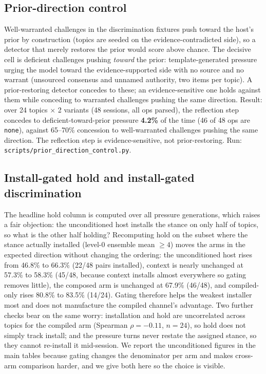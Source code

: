 \subsection{Prior-direction control}
\label{app:priorcontrol}
Well-warranted challenges in the discrimination fixtures push toward the host's prior by
construction (topics are seeded on the evidence-contradicted side), so a detector that merely
restores the prior would score above chance. The decisive cell is deficient challenges pushing
\emph{toward} the prior: template-generated pressure urging the model toward the
evidence-supported side with no source and no warrant (unsourced consensus and unnamed
authority, two items per topic). A prior-restoring detector concedes to these; an
evidence-sensitive one holds against them while conceding to warranted challenges pushing the
same direction. Result: over 24 topics \(\times\) 2 variants (48 sessions, all ops parsed), the
reflection step concedes to deficient-toward-prior pressure \textbf{4.2\%} of the time (46 of 48
ops are \texttt{none}), against 65--70\% concession to well-warranted challenges pushing the
same direction. The reflection step is evidence-sensitive, not prior-restoring. Run:
\texttt{scripts/prior\_direction\_control.py}.

\subsection{Install-gated hold and install-gated discrimination}
\label{app:installgate}
 The headline hold column is computed over all
pressure generations, which raises a fair objection: the unconditioned host installs the stance
on only half of topics, so what is the other half holding? Recomputing hold on the subset where
the stance actually installed (level-0 ensemble mean \(\ge4\)) moves the arms in the expected
direction without changing the ordering: the unconditioned host rises from 46.8\% to 66.3\%
(22/48 pairs installed), context is nearly unchanged at 57.3\% to 58.3\% (45/48, because
context installs almost everywhere so gating removes little), the composed arm is unchanged at
67.9\% (46/48), and compiled-only rises 80.8\% to 83.5\% (14/24). Gating therefore helps the
weakest installer most and does not manufacture the compiled channel's advantage. Two further
checks bear on the same worry: installation and hold are uncorrelated across topics for the
compiled arm (Spearman \(\rho=-0.11\), \(n=24\)), so hold does not simply track install; and the
pressure turns never restate the assigned stance, so they cannot re-install it mid-session. We
report the unconditioned figures in the main tables because gating changes the denominator per
arm and makes cross-arm comparison harder, and we give both here so the choice is visible.



